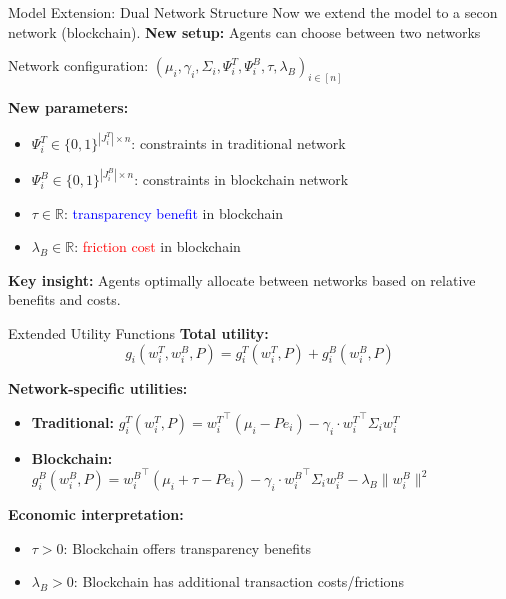 \documentclass{beamer}
\begin{document}
\begin{frame}{Model Extension: Dual Network Structure}
Now we extend the model to a secon network (blockchain).
\textbf{New setup:} Agents can choose between two networks

Network configuration: $(\mu_i, \gamma_i, \Sigma_i, \Psi_i^T, \Psi_i^B, \tau, \lambda_B)_{i \in [n]}$

\vspace{0.3cm}
\textbf{New parameters:}
\begin{itemize}
   \item $\Psi_i^T \in \{0,1\}^{|J_i^T| \times n}$: constraints in traditional network
   \item $\Psi_i^B \in \{0,1\}^{|J_i^B| \times n}$: constraints in blockchain network
   \item $\tau \in \mathbb{R}$: \textcolor{blue}{transparency benefit} in blockchain
   \item $\lambda_B \in \mathbb{R}$: \textcolor{red}{friction cost} in blockchain
\end{itemize}

\vspace{0.3cm}
\textbf{Key insight:} Agents optimally allocate between networks based on relative benefits and costs.
\end{frame}

\begin{frame}{Extended Utility Functions}
\textbf{Total utility:} 
$$g_i(w_i^T,w_i^B, P) = g_i^T(w_i^T,P) + g_i^B(w_i^B,P)$$

\vspace{0.3cm}
\textbf{Network-specific utilities:}
\begin{itemize}
    \item \textbf{Traditional:} $g_i^T(w_i^T,P) = {w_i^T}^\top (\mu_i - P e_i) - \gamma_i \cdot {w_i^T}^\top \Sigma_i w_i^T$
    
    \item \textbf{Blockchain:} $g_i^B(w_i^B,P) = {w_i^B}^\top (\mu_i + \tau - P e_i) - \gamma_i \cdot {w_i^B}^\top \Sigma_i w_i^B - \lambda_B \|w_i^B\|^2$
\end{itemize}

\vspace{0.3cm}
\textbf{Economic interpretation:}
\begin{itemize}
    \item $\tau > 0$: Blockchain offers transparency benefits
    \item $\lambda_B > 0$: Blockchain has additional transaction costs/frictions
\end{itemize}
\end{frame}
\end{document}

